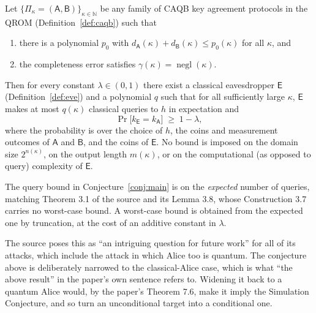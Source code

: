 \documentclass{aicr-conjecture}
\newcommand{\negl}{\operatorname{negl}}
\begin{document}
\begin{conjecture}\label{conj:main}
Let $\{\Pi_\kappa = (\mathsf{A}, \mathsf{B})\}_{\kappa \in \mathbb{N}}$
be any family of CAQB key agreement protocols in the QROM
(Definition~\ref{def:caqb}) such that
\begin{enumerate}
  \item there is a polynomial $p_0$ with
    $d_{\mathsf{A}}(\kappa) + d_{\mathsf{B}}(\kappa) \le p_0(\kappa)$
    for all $\kappa$, and
  \item the completeness error satisfies
    $\gamma(\kappa) = \negl(\kappa)$.
\end{enumerate}
Then for every constant $\lambda \in (0,1)$ there exist a classical
eavesdropper $\mathsf{E}$ (Definition~\ref{def:eve}) and a polynomial
$q$ such that for all sufficiently large $\kappa$, $\mathsf{E}$ makes at
most $q(\kappa)$ classical queries to $h$ in expectation and
\[
  \Pr\bigl[ k_{\mathsf{E}} = k_{\mathsf{A}} \bigr] \;\ge\; 1 - \lambda,
\]
where the probability is over the choice of $h$, the coins and
measurement outcomes of $\mathsf{A}$ and $\mathsf{B}$, and the coins of
$\mathsf{E}$. No bound is imposed on the domain size $2^{n(\kappa)}$, on
the output length $m(\kappa)$, or on the computational (as opposed to
query) complexity of $\mathsf{E}$.
\end{conjecture}

\begin{remark}\label{rem:expected}
The query bound in Conjecture~\ref{conj:main} is on the \emph{expected}
number of queries, matching Theorem 3.1 of the source and its Lemma
3.8, whose Construction 3.7 carries no worst-case bound. A worst-case
bound is obtained from the expected one by truncation, at the cost of an
additive constant in $\lambda$.
\end{remark}

\begin{remark}\label{rem:scope}
The source poses this as ``an intriguing question for future work'' for
all of its attacks, which include the attack in which Alice too is
quantum. The conjecture above is deliberately narrowed to the
classical-Alice case, which is what ``the above result'' in the paper's
own sentence refers to. Widening it back to a quantum Alice would, by
the paper's Theorem 7.6, make it imply the Simulation Conjecture, and so
turn an unconditional target into a conditional one.
\end{remark}
\end{document}
